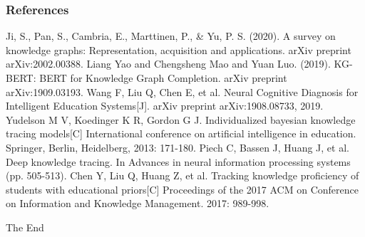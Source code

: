 \documentclass{beamer}
\begin{document}
\begin{frame}[allowframebreaks]
  \frametitle{References}
  \footnotesize{
  \begin{thebibliography}{99} %
      Ji, S., Pan, S., Cambria, E., Marttinen, P., \& Yu, P. S.  (2020). 
      \newblock A survey on knowledge graphs: Representation, acquisition and applications.
      \newblock arXiv preprint arXiv:2002.00388.
      Liang Yao and Chengsheng Mao and Yuan Luo.  (2019). 
      \newblock KG-BERT: BERT for Knowledge Graph Completion.
      \newblock arXiv preprint arXiv:1909.03193.
      Wang F, Liu Q, Chen E, et al. 
      \newblock Neural Cognitive Diagnosis for Intelligent Education Systems[J]. 
      \newblock arXiv preprint arXiv:1908.08733, 2019.
      Yudelson M V, Koedinger K R, Gordon G J. 
      \newblock Individualized bayesian knowledge tracing models[C]
      \newblock International conference on artificial intelligence in education. Springer, Berlin, Heidelberg, 2013: 171-180.  
      Piech C, Bassen J, Huang J, et al.
      \newblock Deep knowledge tracing.
      \newblock In Advances in neural information processing systems (pp. 505-513).
      Chen Y, Liu Q, Huang Z, et al. 
      \newblock Tracking knowledge proficiency of students with educational priors[C]
      \newblock Proceedings of the 2017 ACM on Conference on Information and Knowledge Management. 2017: 989-998.
    \end{thebibliography}

  }
  \end{frame}

\begin{frame}
\Huge{\centerline{The End}}
\end{frame}

\end{document}
